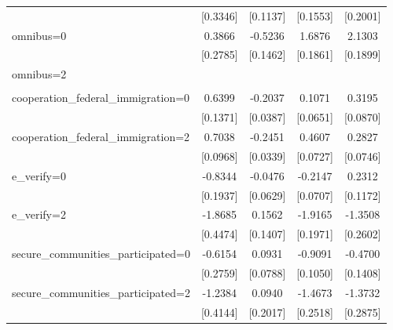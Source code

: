\begin{table}[htbp]
\begin{tabular}{l*{4}{c}}
                    &    [0.3346]         &    [0.1137]         &    [0.1553]         &    [0.2001]         \\
\addlinespace
omnibus=0           &      0.3866         &     -0.5236\sym{***}&      1.6876\sym{***}&      2.1303\sym{***}\\
                    &    [0.2785]         &    [0.1462]         &    [0.1861]         &    [0.1899]         \\
\addlinespace
omnibus=2           &                     &                     &                     &                     \\
                    &                     &                     &                     &                     \\
\addlinespace
cooperation\_federal\_immigration=0&      0.6399\sym{***}&     -0.2037\sym{***}&      0.1071         &      0.3195\sym{***}\\
                    &    [0.1371]         &    [0.0387]         &    [0.0651]         &    [0.0870]         \\
\addlinespace
cooperation\_federal\_immigration=2&      0.7038\sym{***}&     -0.2451\sym{***}&      0.4607\sym{***}&      0.2827\sym{***}\\
                    &    [0.0968]         &    [0.0339]         &    [0.0727]         &    [0.0746]         \\
\addlinespace
e\_verify=0          &     -0.8344\sym{***}&     -0.0476         &     -0.2147\sym{***}&      0.2312\sym{*}  \\
                    &    [0.1937]         &    [0.0629]         &    [0.0707]         &    [0.1172]         \\
\addlinespace
e\_verify=2          &     -1.8685\sym{***}&      0.1562         &     -1.9165\sym{***}&     -1.3508\sym{***}\\
                    &    [0.4474]         &    [0.1407]         &    [0.1971]         &    [0.2602]         \\
\addlinespace
secure\_communities\_participated=0&     -0.6154\sym{**} &      0.0931         &     -0.9091\sym{***}&     -0.4700\sym{***}\\
                    &    [0.2759]         &    [0.0788]         &    [0.1050]         &    [0.1408]         \\
\addlinespace
secure\_communities\_participated=2&     -1.2384\sym{***}&      0.0940         &     -1.4673\sym{***}&     -1.3732\sym{***}\\
                    &    [0.4144]         &    [0.2017]         &    [0.2518]         &    [0.2875]         \\

\end{tabular}
\end{table}

